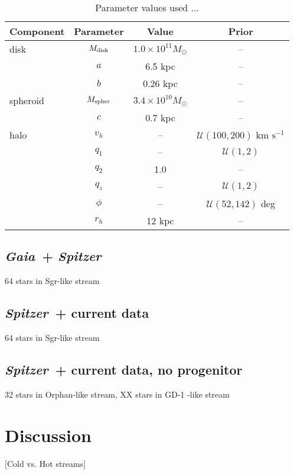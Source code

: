 \documentclass[letterpaper,12pt,preprint]{aastex}
\newcommand{\project}[1]{\textsl{#1}}
\newcommand{\gaia}{\project{Gaia}~}
\newcommand{\spitzer}{\project{Spitzer}~}
\begin{document}
\begin{table}[h]
\begin{center}
	\begin{tabular}{l c c c} \toprule
		{\bf Component} & {\bf Parameter} & {\bf Value} & {\bf Prior} \\\toprule
		disk & $M_{\rm disk}$ & $1.0\times10^{11}M_\odot$ & -- \\ 
		& $a$ & 6.5 kpc & --\\
		& $b$ & 0.26 kpc & --\\
		\midrule
		spheroid & $M_{\rm spher}$ & $3.4\times10^{10}M_\odot$ & --\\ 
		& $c$ & 0.7 kpc & --\\
		\midrule
		halo & $v_h$ & -- & $\mathcal{U}(100,200)$ km $\mathrm{s}^{-1}$ \\
		& $q_1$ & -- & $\mathcal{U}(1,2)$\\
		& $q_2$ & 1.0 & --\\
		& $q_z$ & -- & $\mathcal{U}(1,2)$\\
		& $\phi$ & -- & $\mathcal{U}(52,142)$ deg\\
		& $r_h$ & 12 kpc & --\\
		\bottomrule
		\hline
	\end{tabular}
	\caption{Parameter values used ...\label{tbl:potential}}
\end{center}
\end{table}

\subsection{\gaia + \spitzer}
64 stars in Sgr-like stream

\subsection{\spitzer + current data}
64 stars in Sgr-like stream

\subsection{\spitzer + current data, no progenitor}
32 stars in Orphan-like stream, XX stars in GD-1 -like stream

\section{Discussion}

[Cold vs. Hot streams]
\end{document}
